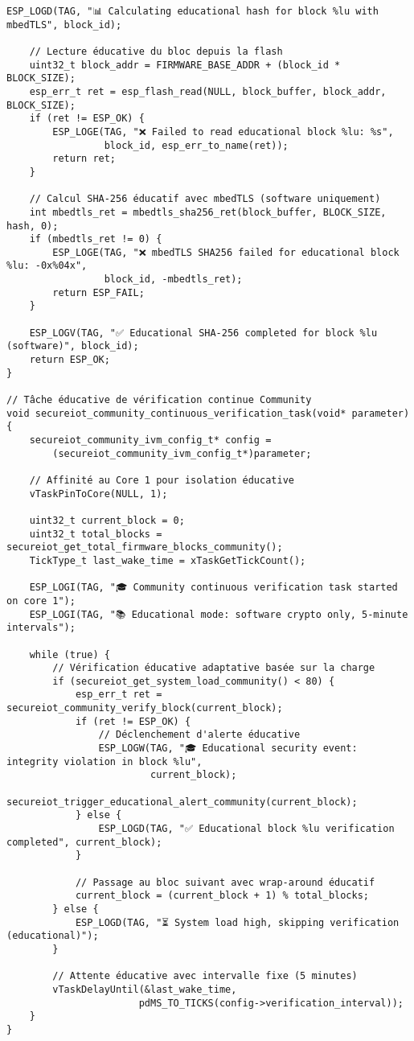 \begin{lstlisting}[caption={Implémentation IVM Community utilisant mbedTLS}]
    ESP_LOGD(TAG, "📊 Calculating educational hash for block %lu with mbedTLS", block_id);
    
    // Lecture éducative du bloc depuis la flash
    uint32_t block_addr = FIRMWARE_BASE_ADDR + (block_id * BLOCK_SIZE);
    esp_err_t ret = esp_flash_read(NULL, block_buffer, block_addr, BLOCK_SIZE);
    if (ret != ESP_OK) {
        ESP_LOGE(TAG, "❌ Failed to read educational block %lu: %s", 
                 block_id, esp_err_to_name(ret));
        return ret;
    }
    
    // Calcul SHA-256 éducatif avec mbedTLS (software uniquement)
    int mbedtls_ret = mbedtls_sha256_ret(block_buffer, BLOCK_SIZE, hash, 0);
    if (mbedtls_ret != 0) {
        ESP_LOGE(TAG, "❌ mbedTLS SHA256 failed for educational block %lu: -0x%04x", 
                 block_id, -mbedtls_ret);
        return ESP_FAIL;
    }
    
    ESP_LOGV(TAG, "✅ Educational SHA-256 completed for block %lu (software)", block_id);
    return ESP_OK;
}

// Tâche éducative de vérification continue Community
void secureiot_community_continuous_verification_task(void* parameter) {
    secureiot_community_ivm_config_t* config = 
        (secureiot_community_ivm_config_t*)parameter;
    
    // Affinité au Core 1 pour isolation éducative
    vTaskPinToCore(NULL, 1);
    
    uint32_t current_block = 0;
    uint32_t total_blocks = secureiot_get_total_firmware_blocks_community();
    TickType_t last_wake_time = xTaskGetTickCount();
    
    ESP_LOGI(TAG, "🎓 Community continuous verification task started on core 1");
    ESP_LOGI(TAG, "📚 Educational mode: software crypto only, 5-minute intervals");
    
    while (true) {
        // Vérification éducative adaptative basée sur la charge
        if (secureiot_get_system_load_community() < 80) {
            esp_err_t ret = secureiot_community_verify_block(current_block);
            if (ret != ESP_OK) {
                // Déclenchement d'alerte éducative
                ESP_LOGW(TAG, "🎓 Educational security event: integrity violation in block %lu", 
                         current_block);
                secureiot_trigger_educational_alert_community(current_block);
            } else {
                ESP_LOGD(TAG, "✅ Educational block %lu verification completed", current_block);
            }
            
            // Passage au bloc suivant avec wrap-around éducatif
            current_block = (current_block + 1) % total_blocks;
        } else {
            ESP_LOGD(TAG, "⏳ System load high, skipping verification (educational)");
        }
        
        // Attente éducative avec intervalle fixe (5 minutes)
        vTaskDelayUntil(&last_wake_time, 
                       pdMS_TO_TICKS(config->verification_interval));
    }
}
\end{lstlisting}

